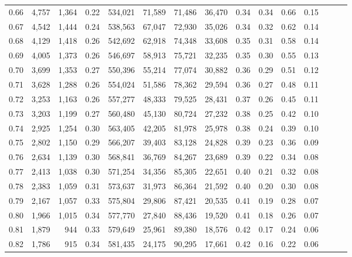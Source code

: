\begin{tabular}{rrrrrrrrrrrrrrr}
0.66 &   4,757 &  1,364 &  0.22 &  534,021 &   71,589 &   71,486 &   36,470 &  0.34 &  0.34 &  0.66 &      0.15 \\
0.67 &   4,542 &  1,444 &  0.24 &  538,563 &   67,047 &   72,930 &   35,026 &  0.34 &  0.32 &  0.62 &      0.14 \\
0.68 &   4,129 &  1,418 &  0.26 &  542,692 &   62,918 &   74,348 &   33,608 &  0.35 &  0.31 &  0.58 &      0.14 \\
0.69 &   4,005 &  1,373 &  0.26 &  546,697 &   58,913 &   75,721 &   32,235 &  0.35 &  0.30 &  0.55 &      0.13 \\
0.70 &   3,699 &  1,353 &  0.27 &  550,396 &   55,214 &   77,074 &   30,882 &  0.36 &  0.29 &  0.51 &      0.12 \\
0.71 &   3,628 &  1,288 &  0.26 &  554,024 &   51,586 &   78,362 &   29,594 &  0.36 &  0.27 &  0.48 &      0.11 \\
0.72 &   3,253 &  1,163 &  0.26 &  557,277 &   48,333 &   79,525 &   28,431 &  0.37 &  0.26 &  0.45 &      0.11 \\
0.73 &   3,203 &  1,199 &  0.27 &  560,480 &   45,130 &   80,724 &   27,232 &  0.38 &  0.25 &  0.42 &      0.10 \\
0.74 &   2,925 &  1,254 &  0.30 &  563,405 &   42,205 &   81,978 &   25,978 &  0.38 &  0.24 &  0.39 &      0.10 \\
0.75 &   2,802 &  1,150 &  0.29 &  566,207 &   39,403 &   83,128 &   24,828 &  0.39 &  0.23 &  0.36 &      0.09 \\
0.76 &   2,634 &  1,139 &  0.30 &  568,841 &   36,769 &   84,267 &   23,689 &  0.39 &  0.22 &  0.34 &      0.08 \\
0.77 &   2,413 &  1,038 &  0.30 &  571,254 &   34,356 &   85,305 &   22,651 &  0.40 &  0.21 &  0.32 &      0.08 \\
0.78 &   2,383 &  1,059 &  0.31 &  573,637 &   31,973 &   86,364 &   21,592 &  0.40 &  0.20 &  0.30 &      0.08 \\
0.79 &   2,167 &  1,057 &  0.33 &  575,804 &   29,806 &   87,421 &   20,535 &  0.41 &  0.19 &  0.28 &      0.07 \\
0.80 &   1,966 &  1,015 &  0.34 &  577,770 &   27,840 &   88,436 &   19,520 &  0.41 &  0.18 &  0.26 &      0.07 \\
0.81 &   1,879 &    944 &  0.33 &  579,649 &   25,961 &   89,380 &   18,576 &  0.42 &  0.17 &  0.24 &      0.06 \\
0.82 &   1,786 &    915 &  0.34 &  581,435 &   24,175 &   90,295 &   17,661 &  0.42 &  0.16 &  0.22 &      0.06 \\

\end{tabular}
